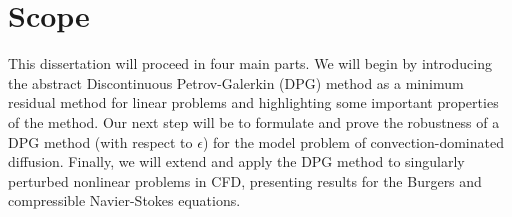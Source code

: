 \section{Scope}

This dissertation will proceed in four main parts.  We will begin by introducing the abstract Discontinuous Petrov-Galerkin (DPG) method as a minimum residual method for linear problems and highlighting some important properties of the method.  Our next step will be to formulate and prove the robustness of a DPG method (with respect to $\epsilon$) for the model problem of convection-dominated diffusion.  Finally, we will extend and apply the DPG method to singularly perturbed nonlinear problems in CFD, presenting results for the Burgers and compressible Navier-Stokes equations.  

